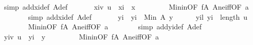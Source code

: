 \begin{isabellebody}
\ {\isacharparenleft}{\kern0pt}simp\ add{\isacharcolon}{\kern0pt}xi{\isacharunderscore}{\kern0pt}def\ A{\isacharunderscore}{\kern0pt}def{\isacharparenright}{\kern0pt}\ \isanewline
\ \ \ \ \isamarkupfalse%
\ xi{\isacharunderscore}{\kern0pt}v{\isacharcolon}{\kern0pt}\ {\isachardoublequoteopen}u\ {\isacharbang}{\kern0pt}\ xi\ {\isacharequal}{\kern0pt}\ x{\isachardoublequoteclose}\ \isanewline
\ \ \ \ \ \ \isamarkupfalse%
\ Min{\isacharunderscore}{\kern0pt}in{\isacharbrackleft}{\kern0pt}OF\ f{\isacharunderscore}{\kern0pt}A\ A{\isacharunderscore}{\kern0pt}ne{\isacharunderscore}{\kern0pt}iff{\isacharbrackleft}{\kern0pt}OF\ a{\isacharunderscore}{\kern0pt}{}{\isacharparenleft}{\kern0pt}{}{\isacharparenright}{\kern0pt}{\isacharbrackright}{\kern0pt}{\isacharbrackright}{\kern0pt}\isanewline
\ \ \ \ \ \ \isamarkupfalse%
\ {\isacharparenleft}{\kern0pt}simp\ add{\isacharcolon}{\kern0pt}xi{\isacharunderscore}{\kern0pt}def\ A{\isacharunderscore}{\kern0pt}def{\isacharparenright}{\kern0pt}\ \isanewline
\ \ \ \ \isamarkupfalse%
\ yi\ \ {\isachardoublequoteopen}yi\ {\isacharequal}{\kern0pt}\ Min\ {\isacharparenleft}{\kern0pt}A\ y{\isacharparenright}{\kern0pt}{\isachardoublequoteclose}\isanewline
\ \ \ \ \isamarkupfalse%
\ yi{\isacharunderscore}{\kern0pt}l{\isacharcolon}{\kern0pt}\ {\isachardoublequoteopen}yi\ {\isacharless}{\kern0pt}\ length\ u{\isachardoublequoteclose}\ \isanewline
\ \ \ \ \ \ \isamarkupfalse%
\ Min{\isacharunderscore}{\kern0pt}in{\isacharbrackleft}{\kern0pt}OF\ f{\isacharunderscore}{\kern0pt}A\ A{\isacharunderscore}{\kern0pt}ne{\isacharunderscore}{\kern0pt}iff{\isacharbrackleft}{\kern0pt}OF\ a{\isacharunderscore}{\kern0pt}{}{\isacharparenleft}{\kern0pt}{}{\isacharparenright}{\kern0pt}{\isacharbrackright}{\kern0pt}{\isacharbrackright}{\kern0pt}\isanewline
\ \ \ \ \ \ \isamarkupfalse%
\ {\isacharparenleft}{\kern0pt}simp\ add{\isacharcolon}{\kern0pt}yi{\isacharunderscore}{\kern0pt}def\ A{\isacharunderscore}{\kern0pt}def{\isacharparenright}{\kern0pt}\ \isanewline
\ \ \ \ \isamarkupfalse%
\ yi{\isacharunderscore}{\kern0pt}v{\isacharcolon}{\kern0pt}\ {\isachardoublequoteopen}u\ {\isacharbang}{\kern0pt}\ yi\ {\isacharequal}{\kern0pt}\ y{\isachardoublequoteclose}\ \isanewline
\ \ \ \ \ \ \isamarkupfalse%
\ Min{\isacharunderscore}{\kern0pt}in{\isacharbrackleft}{\kern0pt}OF\ f{\isacharunderscore}{\kern0pt}A\ A{\isacharunderscore}{\kern0pt}ne{\isacharunderscore}{\kern0pt}iff{\isacharbrackleft}{\kern0pt}OF\ a{\isacharunderscore}{\kern0pt}{}{\isacharparenleft}{\kern0pt}{}{\isacharparenright}{\kern0pt}{\isacharbrackright}{\kern0pt}{\isacharbrackright}{\kern0pt}\isanewline

\end{isabellebody}
